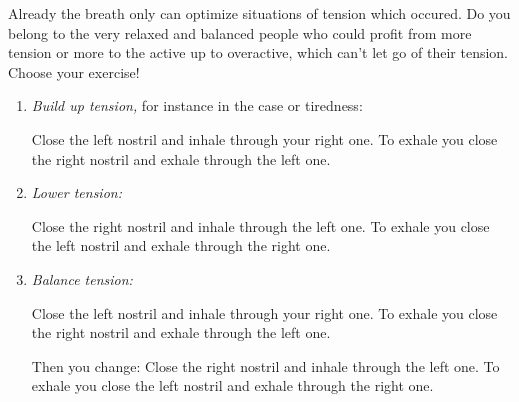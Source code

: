 \documentclass[../main.tex]{subfiles}
\begin{document}
\label{Ex:BreathingEx}
Already the breath only can optimize situations of tension which occured.
Do you belong to the very relaxed and balanced people who could profit from more tension
or more to the active up to overactive, which can't let go of their tension.
Choose your exercise!

\begin{enumerate}
\item \emph{Build up tension,} for instance in the case or tiredness:

  Close the left nostril and inhale through your right one.
  To exhale you close the right nostril and exhale through the left one.

\item \emph{Lower tension:}

  Close the right nostril and inhale through the left one.
  To exhale you close the left nostril and exhale through the right one.

\item \emph{Balance tension:}

  Close the left nostril and inhale through your right one.
  To exhale you close the right nostril and exhale through the left one.

  Then you change:
   Close the right nostril and inhale through the left one.
  To exhale you close the left nostril and exhale through the right one.

\end{enumerate}
\end{document}

